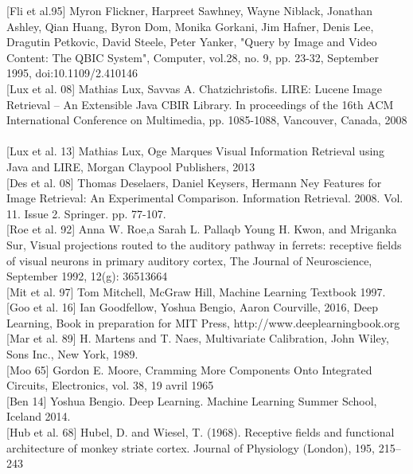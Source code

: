 [Fli et al.95] Myron Flickner, Harpreet Sawhney, Wayne Niblack, Jonathan Ashley, Qian Huang, Byron Dom, Monika Gorkani, Jim Hafner, Denis Lee, Dragutin Petkovic, David Steele, Peter Yanker, "Query by Image and Video Content: The QBIC System", Computer, vol.28, no. 9, pp. 23-32, September 1995, doi:10.1109/2.410146\\

[Lux et al. 08] Mathias Lux, Savvas A. Chatzichristofis. LIRE: Lucene Image Retrieval – An Extensible Java CBIR Library. In proceedings of the 16th ACM International Conference on Multimedia, pp. 1085-1088, Vancouver, Canada, 2008\\\\

[Lux et al. 13] Mathias Lux, Oge Marques Visual Information Retrieval using Java and LIRE, Morgan Claypool Publishers, 2013\\

[Des et al. 08] Thomas Deselaers, Daniel Keysers, Hermann Ney Features for Image Retrieval: An Experimental Comparison. Information Retrieval. 2008. Vol. 11. Issue 2. Springer. pp. 77-107.\\

[Roe et al. 92] Anna W. Roe,a Sarah L. Pallaqb Young H. Kwon, and Mriganka Sur, Visual projections routed to the auditory pathway in ferrets: receptive fields of visual neurons in primary auditory cortex, The Journal of Neuroscience, September 1992, 12(g): 36513664\\

[Mit et al. 97] Tom Mitchell, McGraw Hill, Machine Learning Textbook 1997.\\

[Goo et al. 16] Ian Goodfellow, Yoshua Bengio, Aaron Courville, 2016, Deep Learning, Book in preparation for MIT Press, http://www.deeplearningbook.org\\

[Mar et al. 89] H. Martens and T. Naes, Multivariate Calibration, John Wiley, Sons Inc., New York, 1989.\\

[Moo 65] Gordon E. Moore, Cramming More Components Onto Integrated Circuits, Electronics, vol. 38,‎ 19 avril 1965\\

[Ben 14] Yoshua Bengio. Deep Learning. Machine Learning Summer School, Iceland 2014.\\

[Hub et al. 68] Hubel, D. and Wiesel, T. (1968). Receptive fields and functional architecture of monkey striate cortex. Journal of Physiology (London), 195, 215–243\\

